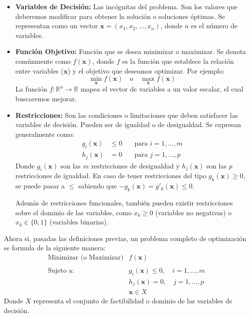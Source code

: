 \documentclass[12pt,a4paper]{book}
\begin{document}
\begin{itemize}
    \item \textbf{Variables de Decisión:} Las incógnitas del problema. Son los valores que deberemos modificar para obtener la solución o soluciones óptimas. Se representan como un vector $\mathbf{x} = (x_1, x_2, \ldots, x_n)$, donde $n$ es el número de variables.

    \item \textbf{Función Objetivo:} Función que se desea minimizar o maximizar. Se denota comúnmente como $f(\mathbf{x})$, donde $f$ es la función que establece la relación entre variables ($\mathbf{x}$) y el objetivo que deseamos optimizar.
    Por ejemplo:
    $$ \min_{\mathbf{x}} f(\mathbf{x}) \quad \text{o} \quad \max_{\mathbf{x}} f(\mathbf{x}) $$
    La función $f: \mathbb{R}^n \to \mathbb{R}$ mapea el vector de variables a un valor escalar, el cual buscaremos mejorar.

    \item \textbf{Restricciones:} Son las condiciones o limitaciones que deben satisfacer las variables de decisión. Pueden ser de igualdad o de desigualdad. Se expresan generalmente como:
    \begin{align*}
        g_i(\mathbf{x}) &\le 0 & \quad \text{para } i = 1, \ldots, m \\
        h_j(\mathbf{x}) &= 0 & \quad \text{para } j = 1, \ldots, p
    \end{align*}
    Donde $g_i(\mathbf{x})$ son las $m$ restricciones de desigualdad y $h_j(\mathbf{x})$ son las $p$ restricciones de igualdad.
    En caso de tener restricciones del tipo $g_k(\mathbf{x})\geq0$, se puede pasar a $\leq$ sabiendo que $-g_k(\mathbf{x})=g'_k(\mathbf{x})\leq0$.
    
    Además de restricciones funcionales, también pueden existir restricciones sobre el dominio de las variables, como $x_k \ge 0$ (variables no negativas) o $x_k \in \{0,1\}$ (variables binarias).
\end{itemize}

Ahora si, pasadas las definiciones previas, un problema completo de optimización se formula de la siguiente manera:
$$
\begin{array}{ll}
\text{Minimizar (o Maximizar)} & f(\mathbf{x}) \\ \\
\text{Sujeto a:} & g_i(\mathbf{x}) \le 0, \quad i = 1, \ldots, m \\
& h_j(\mathbf{x}) = 0, \quad j = 1, \ldots, p \\
& \mathbf{x} \in X
\end{array}
$$
Donde $X$ representa el conjunto de factibilidad o dominio de las variables de decisión.
\end{document}

